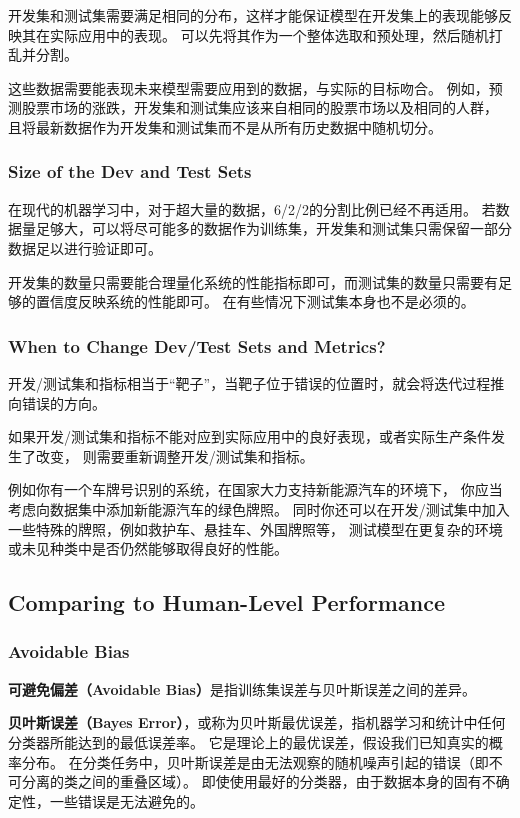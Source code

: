 开发集和测试集需要满足相同的分布，这样才能保证模型在开发集上的表现能够反映其在实际应用中的表现。
可以先将其作为一个整体选取和预处理，然后随机打乱并分割。

这些数据需要能表现未来模型需要应用到的数据，与实际的目标吻合。
例如，预测股票市场的涨跌，开发集和测试集应该来自相同的股票市场以及相同的人群，
且将最新数据作为开发集和测试集而不是从所有历史数据中随机切分。

\subsubsection{Size of the Dev and Test Sets}

在现代的机器学习中，对于超大量的数据，6/2/2的分割比例已经不再适用。
若数据量足够大，可以将尽可能多的数据作为训练集，开发集和测试集只需保留一部分数据足以进行验证即可。

开发集的数量只需要能合理量化系统的性能指标即可，而测试集的数量只需要有足够的置信度反映系统的性能即可。
在有些情况下测试集本身也不是必须的。

\subsubsection{When to Change Dev/Test Sets and Metrics?}

开发/测试集和指标相当于“靶子”，当靶子位于错误的位置时，就会将迭代过程推向错误的方向。

如果开发/测试集和指标不能对应到实际应用中的良好表现，或者实际生产条件发生了改变，
则需要重新调整开发/测试集和指标。

例如你有一个车牌号识别的系统，在国家大力支持新能源汽车的环境下，
你应当考虑向数据集中添加新能源汽车的绿色牌照。
同时你还可以在开发/测试集中加入一些特殊的牌照，例如救护车、悬挂车、外国牌照等，
测试模型在更复杂的环境或未见种类中是否仍然能够取得良好的性能。


\subsection{Comparing to Human-Level Performance}
\label{sec:comparing_to_human_level_performance}

\subsubsection{Avoidable Bias}

\textbf{可避免偏差（Avoidable Bias）}是指训练集误差与贝叶斯误差之间的差异。

\textbf{贝叶斯误差（Bayes Error）}，或称为贝叶斯最优误差，指机器学习和统计中任何分类器所能达到的最低误差率。
它是理论上的最优误差，假设我们已知真实的概率分布。
在分类任务中，贝叶斯误差是由无法观察的随机噪声引起的错误（即不可分离的类之间的重叠区域）。
即使使用最好的分类器，由于数据本身的固有不确定性，一些错误是无法避免的。

